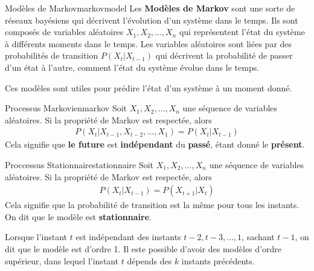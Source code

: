 \begin{definition}{Modèles de Markov}{markovmodel}
    Les \textbf{Modèles de Markov} sont une sorte de réseaux bayésiens qui décrivent 
    l'évolution d'un système dans le temps. Ils sont composés de variables 
    aléatoires $X_1, X_2, \dots, X_n$ qui représentent l'état du système à 
    différents moments dans le temps. Les variables aléatoires sont liées par 
    des probabilités de transition $P(X_t | X_{t-1})$ qui décrivent la 
    probabilité de passer d'un état à l'autre, comment l'état 
    du système évolue dans le temps.
\end{definition}

Ces modèles sont utiles pour prédire l'état d'un système à un moment donné. 


\begin{theorem}{Processus Markovien}{markov}
    Soit $X_1, X_2, \dots, X_n$ une séquence de variables aléatoires. 
    Si la propriété de Markov est respectée, alors 
    \begin{align*}
        P(X_t | X_{t-1}, X_{t-2}, \dots, X_1) = P(X_t | X_{t-1})
    \end{align*}
    Cela signifie que \textbf{le future} est \textbf{indépendant }du \textbf{passé}, étant 
    donné le \textbf{présent}.
\end{theorem}

\begin{theorem}{Proccessus Stationnaire}{stationnaire}
    Soit $X_1, X_2, \dots, X_n$ une séquence de variables aléatoires. 
    Si la propriété de Markov est respectée, alors 
    \begin{align*}
        P(X_t | X_{t-1}) = P(X_{t+1} | X_t)
    \end{align*}
    Cela signifie que la probabilité de transition est la même pour tous les instants. 
    On dit que le modèle est \textbf{stationnaire}. 
\end{theorem}

\begin{remark}\leavevmode
    Lorsque l'instant $t$ est indépendant des instants $t-2, t-3, \dots, 1$, sachant $t-1$,
    on dit que le modèle est d'ordre 1. 
    Il este possible d'avoir des modèles d'ordre supérieur, dans lequel l'instant $t$ dépends 
    des $k$ instants précédents.
\end{remark}

